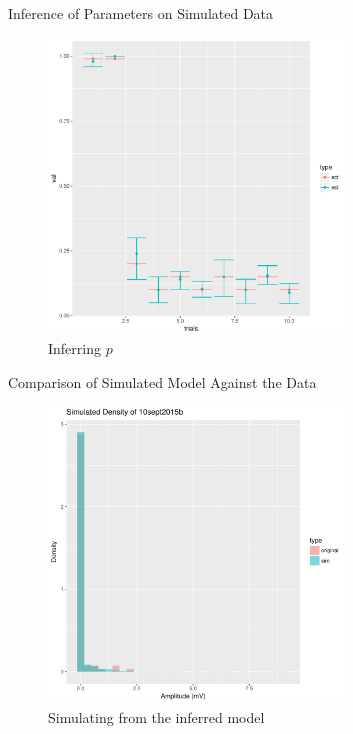 \documentclass{beamer}
\begin{document}
\begin{frame}{Inference of Parameters on Simulated Data}
  \begin{figure}
    \centering
    \includegraphics[width = 0.7\textwidth]{./p-100-samples.pdf}
    \caption{Inferring $p$}
  \end{figure}
\end{frame}

\begin{frame}{Comparison of Simulated Model Against the Data}
  \begin{figure}
    \centering
    \includegraphics[width = 0.7\textwidth]{./10sept2015b-sim-vs-original-N=2-spike2.pdf}
    \caption{Simulating from the inferred model}
  \end{figure}
\end{frame}
\end{document}

